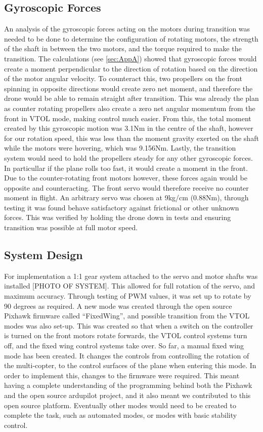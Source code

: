 \subsection{Gyroscopic Forces}
An analysis of the gyroscopic forces acting on the motors during transition was needed to be done to determine the configuration of rotating motors, the strength of the shaft in between the two motors, and the torque required to make the transition. The calculations (see \ref{sec:AppA}) showed that gyroscopic forces would create a moment perpendicular to the direction of rotation based on the direction of the motor angular velocity. To counteract this, two propellers on the front spinning in opposite directions would create zero net moment, and therefore the drone would be able to remain straight after transition. This was already the plan as counter rotating propellers also create a zero net angular momentum from the front in VTOL mode, making control much easier.  From this, the total moment created by this gyroscopic motion was 3.1Nm in the centre of the shaft, however for our rotation speed, this was less than the moment gravity exerted on the shaft while the motors were hovering, which was 9.156Nm. Lastly, the transition system would need to hold the propellers steady for any other gyroscopic forces. In particullar if the plane rolls too fast, it would create a moment in the front. Due to the counter-rotating front motors however, these forces again would be opposite and counteracting. The front servo would therefore receive no counter moment in flight. An arbitrary servo was chosen at 9kg/cm (0.88Nm), through testing it was found behave satisfactory against frictional or other unknown forces. This was verified by holding the drone down in tests and ensuring transition was possible at full motor speed.

\subsection{System Design}
For implementation a 1:1 gear system attached to the servo and motor shafts was installed \color{red}[PHOTO OF SYSTEM]\color{black}. This allowed for full rotation of the servo, and maximum accuracy.  Through testing of PWM values, it was set up to rotate by 90 degrees as required. A new mode was created through the open source Pixhawk firmware called “FixedWing”, and possible transition from the VTOL modes was also set-up. This was created so that when a switch on the controller is turned on the front motors rotate forwards, the VTOL control systems turn off, and the fixed wing control systems take over. So far, a manual fixed wing mode has been created. It changes the controls from controlling the rotation of the multi-copter, to the control surfaces of the plane when entering this mode. In order to implement this, changes to the firmware were required.  This meant having  a complete understanding of the programming behind both the Pixhawk and the open source ardupilot project, and it also meant we contributed to this open source platform. Eventually other modes would need to be created to complete the task, such as automated modes, or modes with basic stability control. 


